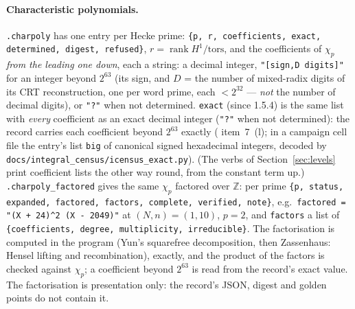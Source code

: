 \documentclass[11pt,openany]{report}
\newcommand{\Z}{\mathbb{Z}}
\newcommand{\tors}{\mathrm{tors}}
\newcommand{\file}[1]{\nolinkurl{#1}}
\begin{document}
\paragraph{Characteristic polynomials.} \texttt{.charpoly} has one entry per Hecke prime: \texttt{\{p, r, coefficients, exact,
determined, digest, refused\}}, $r=\operatorname{rank}H^1/\tors$, and the coefficients of $\chi_p$ \emph{from the leading one
down}, each a string: a decimal integer, \texttt{"[sign,D digits]"} for an integer beyond $2^{63}$ (its sign, and $D$ =
the number of mixed-radix digits of its CRT reconstruction, one per word prime, each $<2^{32}$ --- \emph{not} the number of
decimal digits), or \texttt{"?"} when not determined. \texttt{exact} (since 1.5.4) is the same list with \emph{every} coefficient
as an exact decimal integer (\texttt{"?"} when not determined): the record carries each coefficient beyond $2^{63}$ exactly
({} item~7~(l); in a campaign cell file the entry's list \texttt{big} of canonical signed hexadecimal
integers, decoded by \file{docs/integral\_census/icensus\_exact.py}). (The verbs of Section~\ref{sec:levels} print coefficient lists the other way
round, from the constant term up.) \texttt{.charpoly\_factored} gives the same $\chi_p$ factored over $\Z$: per prime
\texttt{\{p, status, expanded, factored, factors, complete, verified, note\}}, e.g.\ \texttt{factored = "(X + 24)\^{}2 (X - 2049)"}
at $(N,n)=(1,10)$, $p=2$, and \texttt{factors} a list of \texttt{\{coefficients, degree, multiplicity, irreducible\}}. The
factorisation is computed in the program (Yun's squarefree decomposition, then Zassenhaus: Hensel lifting and recombination),
exactly, and the product of the factors is checked against $\chi_p$; a coefficient beyond $2^{63}$ is read from the record's exact
value. The factorisation is presentation only: the record's JSON, digest and golden points do not contain it.
\end{document}
